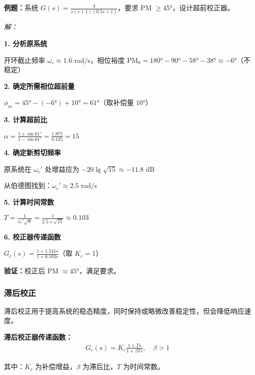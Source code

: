 \vspace{0.3cm}
\textbf{例题：}系统 $G(s) = \frac{4}{s(s+1)(0.5s+1)}$，要求 PM $\geq 45°$，设计超前校正器。

\textit{解：}

\textbf{1. 分析原系统}

开环截止频率 $\omega_c \approx 1.6$ rad/s，相位裕度 PM$_0 = 180° - 90° - 58° - 38° \approx -6°$（不稳定）

\textbf{2. 确定所需相位超前量}

$\phi_m = 45° - (-6°) + 10° = 61°$（取补偿量 $10°$）

\textbf{3. 计算超前比}

$\alpha = \frac{1 + \sin 61°}{1 - \sin 61°} = \frac{1.875}{0.125} = 15$

\textbf{4. 确定新剪切频率}

原系统在 $\omega_c'$ 处增益应为 $-20\lg\sqrt{15} \approx -11.8$ dB

从伯德图找到：$\omega_c' \approx 2.5$ rad/s

\textbf{5. 计算时间常数}

$T = \frac{1}{\omega_c'\sqrt{\alpha}} = \frac{1}{2.5 \times \sqrt{15}} \approx 0.103$

\textbf{6. 校正器传递函数}

$G_c(s) = \frac{1 + 1.545s}{1 + 0.103s}$（取 $K_c = 1$）

\textbf{验证：}校正后 PM $\approx 45°$，满足要求。

\subsubsection{滞后校正}

滞后校正用于提高系统的稳态精度，同时保持或略微改善稳定性，但会降低响应速度。

\textbf{滞后校正器传递函数：}
\begin{align*}
G_c(s) = K_c \frac{1 + T s}{1 + \beta T s}, \quad \beta > 1
\end{align*}

其中：$K_c$ 为补偿增益，$\beta$ 为滞后比，$T$ 为时间常数。

